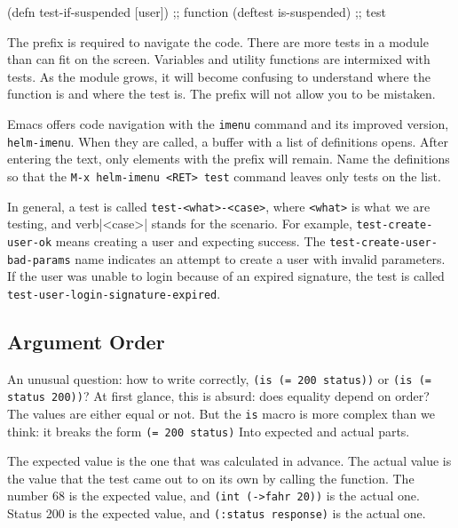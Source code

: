 \else

\begin{english}
  \begin{clojure}
(defn test-if-suspended [user]) ;; function
(deftest is-suspended)          ;; test
  \end{clojure}
\end{english}

\fi

The prefix is required to navigate the code. There are more tests in a module than can fit on the screen. Variables and utility functions are intermixed with tests. As the module grows, it will become confusing to understand where the function is and where the test is. The prefix will not allow you to be mistaken.



Emacs offers code navigation with the \verb|imenu| command and its improved version, \verb|helm-imenu|. When they are called, a buffer with a list of definitions opens. After entering the text, only elements with the prefix will remain. Name the definitions so that the \verb|M-x helm-imenu <RET> test| command leaves only tests on the list.

In general, a test is called \verb|test-<what>-<case>|, where \verb|<what>| is what we are testing, and verb|<case>| stands for the scenario. For example, \verb|test-create-user-ok| means creating a user and expecting success. The \verb|test-create-user-bad-params| name indicates an attempt to create a user with invalid parameters. If the user was unable to login because of an expired signature, the test is called \verb|test-user-login-signature-expired|.

\subsection{Argument Order}


An unusual question: how to write correctly, \verb|(is (= 200 status))| or \verb|(is (= status 200))|? At first glance, this is absurd: does equality depend on order? The values are either equal or not. But the \verb|is| macro is more complex than we think: it breaks the form \verb|(= 200 status)| Into expected and actual parts.


The expected value is the one that was calculated in advance. The actual value is the value that the test came out to on its own by calling the function. The number 68 is the expected value, and \verb|(int (->fahr 20))| is the actual one. Status 200 is the expected value, and \verb|(:status response)| is the actual one.

